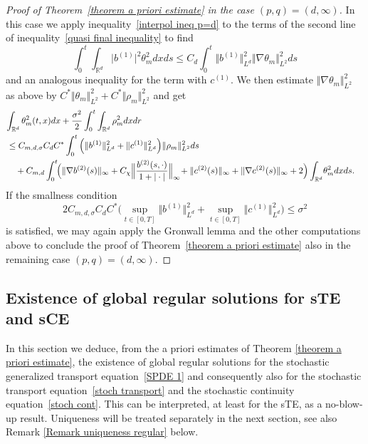 \documentclass[a4paper,10pt]{article}
\newcommand\1{\mathbbm{1}}
\numberwithin{equation}{section}
\begin{document}
\begin{proof}[Proof of Theorem~\ref{theorem a priori estimate} in the case
$(p,q) =(d,\infty)$] 
In this case we apply inequality~\eqref{interpol ineq p=d} to the terms of the second line of
inequality~\eqref{quasi final inequality} to find
\begin{equation*}
\int_{0}^{t}\int_{\mathbb{R}^{d}} \vert b^{(1)} \vert
^{2}\theta_{m}^{2}dxds  \leq C_d \int_{0}^{t} \Vert b^{(1) }\Vert _{L^{d}}^2 \Vert \nabla \theta_m \Vert_{L^{2}}^2 ds
\end{equation*}
and an analogous inequality for the term with $c^{(1)}$. We then estimate $\Vert \nabla\theta_{m} \Vert _{L^{2}}^{2}$ as above by $C^{\ast} \Vert \theta_{m} \Vert _{L^{2}}^{2}+C^{\ast} \Vert \rho_{m} \Vert _{L^{2} 
}^{2}$ and get
\begin{align*}
\lefteqn{ \int_{\mathbb{R}^{d}}\theta_{m}^{2}(t,x)dx+\frac{\sigma^{2}}{2}\int_{0}^{t}\int_{\mathbb{R}^{d}}\rho_{m}^{2}dxdr } \\
& \leq C_{m,d,\sigma}C_{d}C^{\ast}\int_{0}^{t} \Big(  \Vert b^{(1) }\Vert _{L^{d}}^2 + \Vert c^{(1) }\Vert _{L^{d}}^2 \Big)  \Vert \rho_{m} \Vert _{L^{2}}^{2}ds\\
& \quad{}  +C_{m,d}\int_{0}^{t} \!\! \Big( \Vert \nabla b^{(2)}(s) \Vert_{\infty}+ C_{\chi}\Big\Vert \frac{b^{(2)}(s,\cdot) }{1+\vert \cdot \vert }\Big \Vert_{\infty} \! + \Vert c^{(2)}(s) \Vert _{\infty}+ \Vert \nabla c^{(2)
}(s) \Vert _{\infty} +2 \Big)  \int_{\mathbb{R}^{d}} \! \theta_{m}^{2}dxds .
\end{align*}
If the smallness condition
\begin{equation}
2C_{m,d,\sigma}C_{d}C^{\ast} \big(\sup_{t\in [0,T]  }  \Vert b^{(1) }\Vert _{L^{d}}^2 +\sup_{t\in [0,T]}  \Vert c^{(1) }\Vert _{L^{d}}^2 \big)  \leq\sigma^{2}\label{precise smallness} 
\end{equation}
is satisfied, we may again apply the Gronwall lemma and the other computations above to conclude the proof of Theorem~\ref{theorem a priori estimate} also in the remaining case $(p,q) =(d,\infty)$.
\end{proof}

\subsection{Existence of global regular solutions for sTE and sCE\label{subsection regularity results}}

In this section we deduce, from the a priori estimates of Theorem
\ref{theorem a priori estimate}, the existence of global regular
solutions for the stochastic generalized transport equation~\eqref{SPDE 1} and consequently also for the stochastic transport equation~\eqref{stoch transport} and the stochastic continuity equation~\eqref{stoch cont}. This can be interpreted, at least for the sTE, as a no-blow-up result. Uniqueness will be treated separately in the next section, see also Remark
\ref{Remark uniqueness regular} below. 
\end{document}
